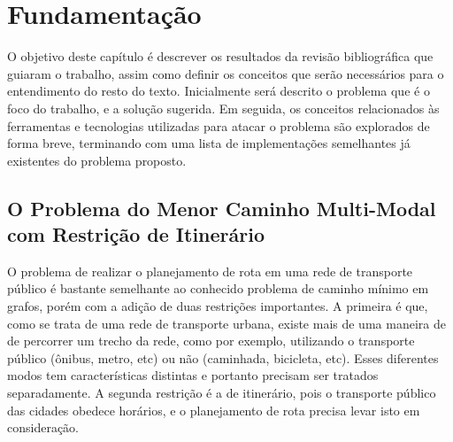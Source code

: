 
\chapter{Fundamentação}
\label{fund}

O objetivo deste capítulo é descrever os resultados da revisão bibliográfica que guiaram o trabalho, assim como definir os conceitos que serão necessários para o entendimento do resto do texto. Inicialmente será descrito o problema que é o foco do trabalho, e a solução sugerida. Em seguida, os conceitos relacionados às ferramentas e tecnologias utilizadas para atacar o problema são explorados de forma breve, terminando com uma lista de implementações semelhantes já existentes do problema proposto.

\section{O Problema do Menor Caminho Multi-Modal com Restrição de Itinerário}



O problema de realizar o planejamento de rota em uma rede de transporte público é bastante semelhante ao conhecido problema de caminho mínimo em grafos, porém com a adição de duas restrições importantes.
A primeira é que, como se trata de uma rede de transporte urbana, existe mais de uma maneira de de percorrer um trecho da rede, como por exemplo, utilizando o transporte público (ônibus, metro, etc) ou não (caminhada, bicicleta, etc).
Esses diferentes modos tem características distintas e portanto precisam ser tratados separadamente.
A segunda restrição é a de itinerário, pois o transporte público das cidades obedece horários, e o planejamento de rota precisa levar isto em consideração.

